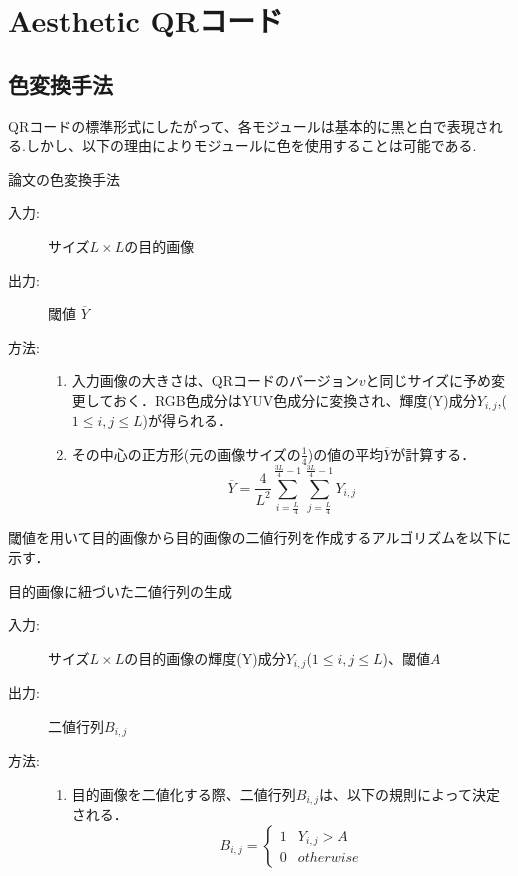 \documentclass{thesis}
\begin{document}

\chapter{Aesthetic QRコード}

\section{色変換手法}
QRコードの標準形式にしたがって、各モジュールは基本的に黒と白で表現される.しかし、以下の理由によりモジュールに色を使用することは可能である.


\begin{algorithm}                      
\caption{論文\cite{KURI}の色変換手法}         
\label{alg:alg1} 
\begin{description}
\item[入力:] サイズ$L \times L$の目的画像
\item[出力:] 閾値 $\overline{Y}$
\item[方法:]
\begin{enumerate}
\item 入力画像の大きさは、QRコードのバージョン$v$と同じサイズに予め変更しておく．RGB色成分はYUV色成分に変換され、輝度(Y)成分$Y_{i,j}$,($1 \leq i,j \leq L$)が得られる．
\item その中心の正方形(元の画像サイズの$\frac{1}{4}$)の値の平均$\overline{Y}$が計算する．
\begin{equation}
\overline{Y} = \frac{4}{L^2} \sum_{i = \frac{L}{4}}^{\frac{3L}{4} - 1} \sum_{j = \frac{L}{4}}^{\frac{3L}{4} - 1} Y_{i,j}
\label{eq:pol4}
\end{equation}
\end{enumerate}
\end{description}
\end{algorithm}  


閾値を用いて目的画像から目的画像の二値行列を作成するアルゴリズムを以下に示す．

\begin{algorithm}                      
\caption{目的画像に紐づいた二値行列の生成}         
\label{alg:alg2} 
\begin{description}
\item[入力:] サイズ$L \times L$の目的画像の輝度(Y)成分$Y_{i,j}$($1 \leq i,j \leq L$)、閾値$A$
\item[出力:] 二値行列$B_{i,j}$
\item[方法:]
\begin{enumerate}
\item 目的画像を二値化する際、二値行列$B_{i,j}$は、以下の規則によって決定される．
\begin{equation}
{B_{i,j} =}
\begin{cases}
1 & Y_{i,j} > A \\
0 & otherwise 
\end{cases}
\label{eq:binary}
\end{equation}
\end{enumerate}
\end{description}
\end{algorithm} 
\end{document}
